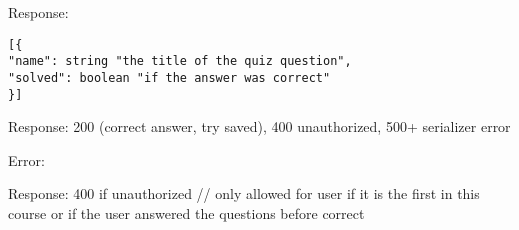 Response:

\begin{verbatim}
[{
"name": string "the title of the quiz question",
"solved": boolean "if the answer was correct"
}]
\end{verbatim}

Response: 200 (correct answer, try saved), 400 unauthorized, 500+
serializer error

Error:

Response: 400 if unauthorized // only allowed for user if it is the
first in this course or if the user answered the questions before
correct

